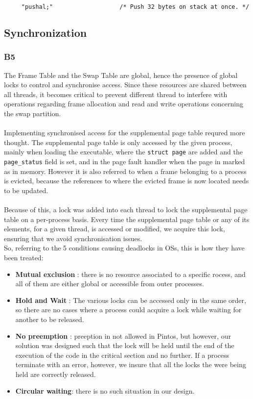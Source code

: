 \documentclass[a4wide, 11pt]{article}
\newcommand{\tx}{\texttt}
\begin{document}
\begin{verbatim}
     "pushal;"                   /* Push 32 bytes on stack at once. */
\end{verbatim}

\subsection{Synchronization}
\subsubsection{B5}

The Frame Table and the Swap Table are global, hence the presence of global locks to control and synchronise access. Since these resources are shared between all threads, it becomes critical to prevent different thread to interfere with operations regarding frame allocation and read and write operations concerning the swap partition.\\
\\
Implementing synchronised access for the supplemental page table requred more thought. The supplemental page table is only accessed by the given process, mainly when loading the executable, where the \tx{struct page} are added and the \tx{page\_status} field is set, and in the page fault handler when the page in marked as in memory. However it is also referred to when a frame belonging to a process is evicted, because the references to where the evicted frame is now located needs to be updated.\\
\\
Because of this, a lock was added into each thread to lock the supplemental page table on a per-process basis. Every time the supplemental page table or any of its elements, for a given thread, is accessed or modified, we acquire this lock, ensuring that we avoid synchronisation issues.
\\
So, referring to the 5 conditions causing deadlocks in OSs, this is how they have been treated:
\begin{itemize}
\item \textbf{Mutual exclusion} : there is no resource associated to a specific rocess, and all of them are either global or accessible from outer processes.
\item \textbf{Hold and Wait} : The various locks can be accessed only in the same order, so there are no cases where a process could acquire a lock while waiting for another to be released.
\item \textbf{No preemption} : preeption in not allowed in Pintos, but however, our solution was designed such that the lock will be held until the end of the execution of the code in the critical section and no further. If a process terminate with an error, however, we insure that all the locks the were being held are correctly released.
\item \textbf{Circular waiting}: there is no such situation in our design.
\end{itemize}
\end{document}
